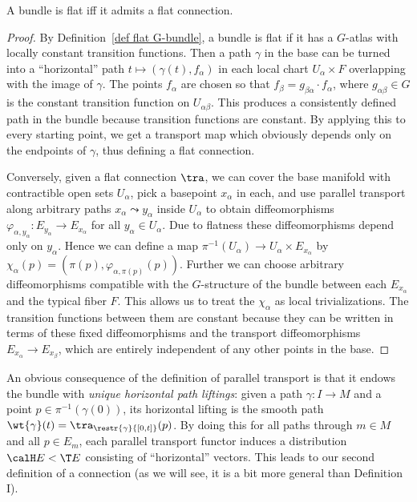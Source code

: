 \begin{prop}
    A bundle is flat iff it admits a flat connection.
\end{prop}
\begin{proof}
    By Definition~\ref{def flat G-bundle}, a bundle is flat if it  has a $G$-atlas with locally constant transition functions. Then a path $\gamma$ in the base can be turned into a ``horizontal'' path $t\mapsto (\gamma(t),f_\alpha)$ in each local chart $U_\alpha\times F$ overlapping with the image of $\gamma$. The points $f_\alpha$ are chosen so that $f_\beta=g_{\beta\alpha}\cdot f_\alpha$, where $g_{\alpha\beta}\in G$ is the constant transition function on $U_{\alpha\beta}$. This produces a consistently defined path in the bundle because transition functions are constant. By applying this to every starting point, we get a transport map which obviously depends only on the endpoints of $\gamma$, thus defining a flat connection.

    Conversely, given a flat connection $\tra$, we can cover the base manifold with contractible open sets $U_\alpha$, pick a basepoint $x_\alpha$ in each, and use parallel transport along arbitrary paths $x_\alpha\leadsto y_\alpha$ inside $U_\alpha$ to obtain diffeomorphisms $\varphi_{\alpha,y_\alpha}:E_{y_\alpha}\to E_{x_\alpha}$ for all $y_\alpha\in U_\alpha$. Due to flatness these diffeomorphisms depend only on $y_\alpha$. Hence we can define a map $\pi^{-1}(U_\alpha)\to U_\alpha\times E_{x_\alpha}$ by $\chi_\alpha(p)=(\pi(p),\varphi_{\alpha,\pi(p)}(p))$. Further we can choose arbitrary diffeomorphisms compatible with the $G$-structure of the bundle between each $E_{x_\alpha}$ and the typical fiber $F$. This allows us to treat the $\chi_\alpha$ as local trivializations. The transition functions between them are constant because they can be written in terms of these fixed diffeomorphisms and the transport diffeomorphisms $E_{x_\alpha}\to E_{x_\beta}$, which are entirely independent of any other points in the base.
\end{proof}

An obvious consequence of the definition of parallel transport is that it endows the bundle with \emph{unique horizontal path liftings}: given a path $\gamma:I\to M$ and a point $p\in\pi^{-1}(\gamma(0))$, its horizontal lifting is the smooth path $\wt{\gamma}(t)=\tra_{\restr{\gamma}{[0,t]}}(p)$. By doing this for all paths through $m\in M$ and all $p\in E_m$, each parallel transport functor induces a distribution $\calH E<\T E$ consisting of ``horizontal'' vectors. This leads to our second definition of a connection (as we will see, it is a bit more general than Definition I).


